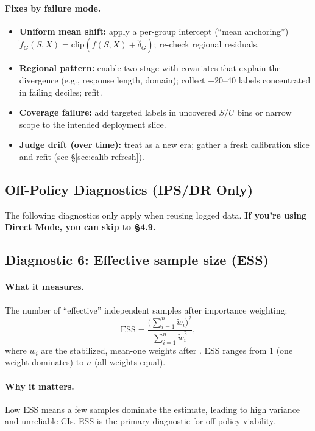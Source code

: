 \begin{enumerate}[resume]
\paragraph{Fixes by failure mode.}
\begin{itemize}
\item \textbf{Uniform mean shift:} apply a per-group intercept (``mean anchoring'') $\tilde f_G(S,X)=\mathrm{clip}(f(S,X)+\hat\delta_G)$; re-check regional residuals.
\item \textbf{Regional pattern:} enable two-stage \autocal{} with covariates that explain the divergence (e.g., response length, domain); collect +20--40 labels concentrated in failing deciles; refit.
\item \textbf{Coverage failure:} add targeted labels in uncovered $S$/$U$ bins or narrow scope to the intended deployment slice.
\item \textbf{Judge drift (over time):} treat as a new era; gather a fresh calibration slice and refit (see \S\ref{sec:calib-refresh}).
\end{itemize}

\subsection*{Off-Policy Diagnostics (IPS/DR Only)}

The following diagnostics only apply when reusing logged data. \textbf{If you're using Direct Mode, you can skip to §4.9.}

\subsection{Diagnostic 6: Effective sample size (ESS)}

\paragraph{What it measures.} The number of ``effective'' independent samples after importance weighting:
\begin{equation}
\text{ESS} = \frac{\big(\sum_{i=1}^n \tilde{w}_i\big)^2}{\sum_{i=1}^n \tilde{w}_i^2},
\end{equation}
where $\tilde{w}_i$ are the stabilized, mean-one weights after \simcal. ESS ranges from 1 (one weight dominates) to $n$ (all weights equal).

\paragraph{Why it matters.} Low ESS means a few samples dominate the estimate, leading to high variance and unreliable CIs. ESS is the primary diagnostic for off-policy viability.


\end{enumerate}

